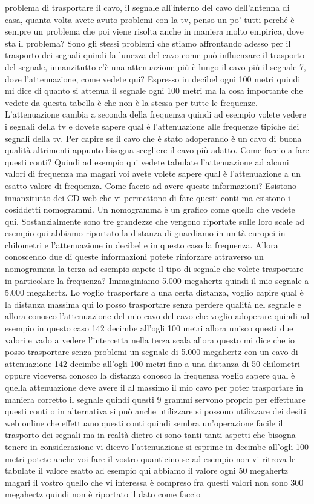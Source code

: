 {problema di trasportare il cavo, il segnale all'interno del cavo dell'antenna di casa, quanta volta avete avuto problemi con la tv, penso un po' tutti perché è sempre un problema che poi viene risolta anche in maniera molto empirica, dove sta il problema? Sono gli stessi problemi che stiamo affrontando adesso per il trasporto dei segnali quindi la lunezza del cavo come può influenzare il trasporto del segnale, innanzitutto c'è una attenuazione più è lungo il cavo più il segnale 7, dove l'attenuazione, come vedete qui? Espresso in decibel ogni 100 metri quindi mi dice di quanto si attenua il segnale ogni 100 metri ma la cosa importante che vedete da questa tabella è che non è la stessa per tutte le frequenze. L'attenuazione cambia a seconda della frequenza quindi ad esempio volete vedere i segnali della tv e dovete sapere qual è l'attenuazione alle frequenze tipiche dei segnali della tv. Per capire se il cavo che è stato adoperando è un cavo di buona qualità altrimenti appunto bisogna scegliere il cavo più adatto. Come faccio a fare questi conti? Quindi ad esempio qui vedete tabulate l'attenuazione ad alcuni valori di frequenza ma magari voi avete volete sapere qual è l'attenuazione a un esatto valore di frequenza. Come faccio ad avere queste informazioni? Esistono innanzitutto dei CD web che vi permettono di fare questi conti ma esistono i cosiddetti nomogrammi. Un nomogramma è un grafico come quello che vedete qui. Sostanzialmente sono tre grandezze che vengono riportate sulle loro scale ad esempio qui abbiamo riportato la distanza di guardiamo in unità europei in chilometri e l'attenuazione in decibel e in questo caso la frequenza. Allora conoscendo due di queste informazioni potete rinforzare attraverso un nomogramma la terza ad esempio sapete il tipo di segnale che volete trasportare in particolare la frequenza? Immaginiamo 5.000 megahertz quindi il mio segnale a 5.000 megahertz. Lo voglio trasportare a una certa distanza, voglio capire qual è la distanza massima qui lo posso trasportare senza perdere qualità nel segnale e allora conosco l'attenuazione del mio cavo del cavo che voglio adoperare quindi ad esempio in questo caso 142 decimbe all'ogli 100 metri allora unisco questi due valori e vado a vedere l'intercetta nella terza scala allora questo mi dice che io posso trasportare senza problemi un segnale di 5.000 megahertz con un cavo di attenuazione 142 decimbe all'ogli 100 metri fino a una distanza di 50 chilometri oppure viceversa conosco la distanza conosco la frequenza voglio sapere qual è quella attenuazione deve avere il al massimo il mio cavo per poter trasportare in maniera corretto il segnale quindi questi 9 grammi servono proprio per effettuare questi conti o in alternativa si può anche utilizzare si possono utilizzare dei desiti web online che effettuano questi conti quindi sembra un'operazione facile il trasporto dei segnali ma in realtà dietro ci sono tanti tanti aspetti che bisogna tenere in considerazione vi dicevo l'attenuazione si esprime in decimbe all'ogli 100 metri potete anche voi fare il vostro quanticino se ad esempio non vi ritrova le tabulate il valore esatto ad esempio qui abbiamo il valore ogni 50 megahertz magari il vostro quello che vi interessa è compreso fra questi valori non sono 300 megahertz quindi non è riportato il dato come faccio }
